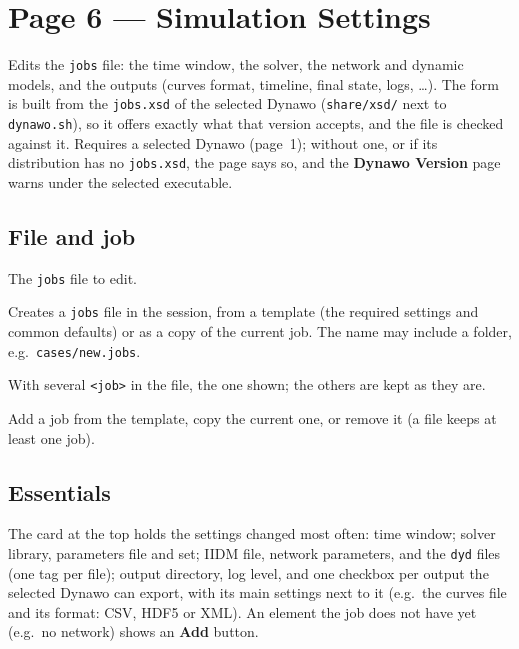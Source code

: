 \documentclass[a4paper,11pt]{article}
\newcommand{\code}[1]{\texttt{\small #1}}
\newcommand{\ftype}[1]{\texttt{\small\color{rteblu}#1}}
\begin{document}
\section{Page 6 --- Simulation Settings}
\label{sec:simsettings}

Edits the \ftype{jobs} file: the time window, the solver, the network and
dynamic models, and the outputs (curves format, timeline, final state, logs,
\ldots). The form is built from the \code{jobs.xsd} of the selected Dynawo
(\code{share/xsd/} next to \code{dynawo.sh}), so it offers exactly what that
version accepts, and the file is checked against it. Requires a selected
Dynawo (page~1); without one, or if its distribution has no \code{jobs.xsd},
the page says so, and the \textbf{Dynawo Version} page warns under the
selected executable.

\subsection{File and job}

\begin{description}[leftmargin=2em]
  \item[\textbf{File}] The \ftype{jobs} file to edit.
  \item[\textbf{New file}] Creates a \ftype{jobs} file in the session, from a
    template (the required settings and common defaults) or as a copy of the
    current job. The name may include a folder, e.g.\ \code{cases/new.jobs}.
  \item[\textbf{Job}] With several \code{<job>} in the file, the one shown;
    the others are kept as they are.
  \item[\textbf{Add job} / \textbf{Duplicate} / \textbf{Remove}] Add a job
    from the template, copy the current one, or remove it (a file keeps at
    least one job).
\end{description}

\subsection{Essentials}

The card at the top holds the settings changed most often: time window;
solver library, parameters file and set; IIDM file, network parameters, and
the \ftype{dyd} files (one tag per file); output directory, log level, and one
checkbox per output the selected Dynawo can export, with its main settings
next to it (e.g.\ the curves file and its format: CSV, HDF5 or XML). An
element the job does not have yet (e.g.\ no network) shows an \textbf{Add}
button.
\end{document}
